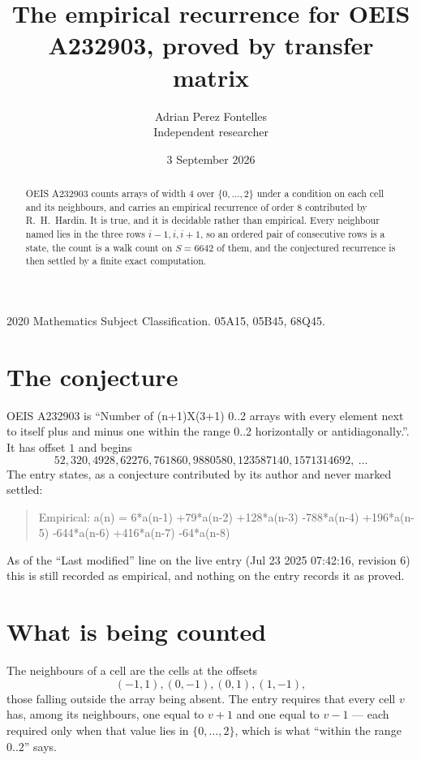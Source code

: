 \documentclass[11pt,a4paper]{article}
\title{The empirical recurrence for OEIS A232903, proved by transfer matrix}
\author{Adrian Perez Fontelles\\ \small Independent researcher}
\date{3 September 2026}
\theoremstyle{plain}
\theoremstyle{definition}
\begin{document}
\maketitle

\begin{abstract}
OEIS A232903 counts arrays of width $4$ over $\{0,\dots,2\}$ under a condition on each cell
and its neighbours, and carries an empirical recurrence of order $8$ contributed by
R.~H.~Hardin. It is true, and it is decidable rather than empirical. Every neighbour named lies
in the three rows $i-1,i,i+1$, so an ordered pair of consecutive rows is a state, the count is
a walk count on $S=6642$ of them, and the conjectured recurrence is then settled by a finite
exact computation.
\end{abstract}

\noindent\small 2020 Mathematics Subject Classification. 05A15, 05B45, 68Q45.\normalsize

\section{The conjecture}

OEIS A232903 is ``Number of (n+1)X(3+1) 0..2 arrays with every element next to itself plus and minus one within the range 0..2 horizontally or antidiagonally.''. It has offset $1$ and begins
\[
52, 320, 4928, 62276, 761860, 9880580, 123587140, 1571314692,\ \dots
\]
The entry states, as a conjecture contributed by its author and never marked settled:
\begin{quote}
Empirical: a(n) = 6*a(n-1) +79*a(n-2) +128*a(n-3) -788*a(n-4) +196*a(n-5) -644*a(n-6) +416*a(n-7) -64*a(n-8)
\end{quote}
As of the ``Last modified'' line on the live entry (Jul 23 2025 07:42:16, revision 6) this is still
recorded as empirical, and nothing on the entry records it as proved.

\section{What is being counted}

The neighbours of a cell are the cells at the offsets
\[
(-1,1), (0,-1), (0,1), (1,-1),
\]
those falling outside the array being absent. The entry requires that every cell $v$ has, among its neighbours, one equal to $v+1$ and one equal to $v-1$ --- each required only when that value lies in $\{0,\dots,2\}$, which is what ``within the range $0..2$'' says.
\end{document}
